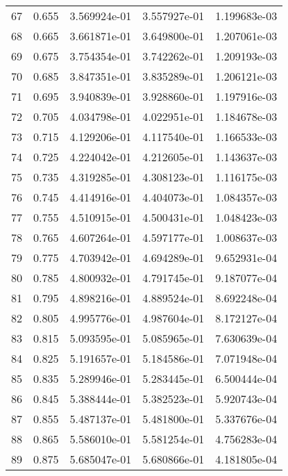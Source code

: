 \begin{table}[ht]
\begin{tabular}{rcccc}
    67 &  0.655 &    3.569924e-01 &    3.557927e-01  &     1.199683e-03\\ 
    68 &  0.665 &    3.661871e-01 &    3.649800e-01  &     1.207061e-03\\ 
    69 &  0.675 &    3.754354e-01 &    3.742262e-01  &     1.209193e-03\\ 
    70 &  0.685 &    3.847351e-01 &    3.835289e-01  &     1.206121e-03\\ 
    71 &  0.695 &    3.940839e-01 &    3.928860e-01  &     1.197916e-03\\ 
    72 &  0.705 &    4.034798e-01 &    4.022951e-01  &     1.184678e-03\\ 
    73 &  0.715 &    4.129206e-01 &    4.117540e-01  &     1.166533e-03\\ 
    74 &  0.725 &    4.224042e-01 &    4.212605e-01  &     1.143637e-03\\ 
    75 &  0.735 &    4.319285e-01 &    4.308123e-01  &     1.116175e-03\\ 
    76 &  0.745 &    4.414916e-01 &    4.404073e-01  &     1.084357e-03\\ 
    77 &  0.755 &    4.510915e-01 &    4.500431e-01  &     1.048423e-03\\ 
    78 &  0.765 &    4.607264e-01 &    4.597177e-01  &     1.008637e-03\\ 
    79 &  0.775 &    4.703942e-01 &    4.694289e-01  &     9.652931e-04\\ 
    80 &  0.785 &    4.800932e-01 &    4.791745e-01  &     9.187077e-04\\ 
    81 &  0.795 &    4.898216e-01 &    4.889524e-01  &     8.692248e-04\\ 
    82 &  0.805 &    4.995776e-01 &    4.987604e-01  &     8.172127e-04\\ 
    83 &  0.815 &    5.093595e-01 &    5.085965e-01  &     7.630639e-04\\ 
    84 &  0.825 &    5.191657e-01 &    5.184586e-01  &     7.071948e-04\\ 
    85 &  0.835 &    5.289946e-01 &    5.283445e-01  &     6.500444e-04\\ 
    86 &  0.845 &    5.388444e-01 &    5.382523e-01  &     5.920743e-04\\ 
    87 &  0.855 &    5.487137e-01 &    5.481800e-01  &     5.337676e-04\\ 
    88 &  0.865 &    5.586010e-01 &    5.581254e-01  &     4.756283e-04\\ 
    89 &  0.875 &    5.685047e-01 &    5.680866e-01  &     4.181805e-04\\ 

\end{tabular}
\end{table}
